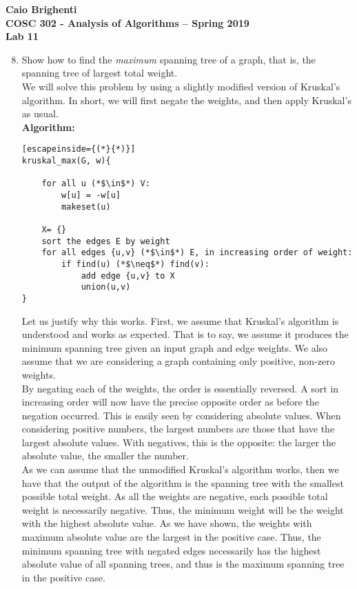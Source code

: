 \documentclass{article}
\begin{document}
\noindent \textbf{Caio Brighenti }\\
\noindent \textbf{COSC 302 - Analysis of Algorithms -- Spring 2019}\\%
\noindent \textbf{Lab 11}\vspace{1em}\\
\begin{enumerate}
	\setcounter{enumi}{7}
	\item Show how to find the \emph{maximum} spanning tree of a graph, that is, the spanning tree of largest total weight.
	\\ We will solve this problem by using a slightly modified version of Kruskal's algorithm. In short, we will first negate the weights, and then apply Kruskal's as usual. 
	\\ \textbf{Algorithm:}
	\begin{lstlisting}[escapeinside={(*}{*)}]
kruskal_max(G, w){

	for all u (*$\in$*) V:
		w[u] = -w[u]
		makeset(u)
		
	X= {}
	sort the edges E by weight
	for all edges {u,v} (*$\in$*) E, in increasing order of weight:
		if find(u) (*$\neq$*) find(v):
			add edge {u,v} to X
			union(u,v)
}
	\end{lstlisting}
	Let us justify why this works. First, we assume that Kruskal's algorithm is understood and works as expected. That is to say, we assume it produces the minimum spanning tree given an input graph and edge weights. We also assume that we are considering a graph containing only positive, non-zero weights. 
	\\ By negating each of the weights, the order is essentially reversed. A sort in increasing order will now have the precise opposite order as before the negation occurred. This is easily seen by considering absolute values. When considering positive numbers, the largest numbers are those that have the largest absolute values. With negatives, this is the opposite: the larger the absolute value, the smaller the number. 
	\\ As we can assume that the unmodified Kruskal's algorithm works, then we have that the output of the algorithm is the spanning tree with the smallest possible total weight. As all the weights are negative, each possible total weight is necessarily negative. Thus, the minimum weight will be the weight with the highest absolute value. As we have shown, the weights with maximum absolute value are the largest in the positive case. Thus, the minimum spanning tree with negated edges necessarily has the highest absolute value of all spanning trees, and thus is the maximum spanning tree in the positive case.
\end{enumerate}
\end{document}
